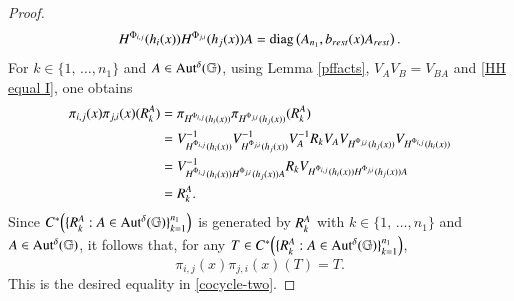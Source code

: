 \documentclass[leqno]{amsart}
\begin{document}
\begin{proof}
\begin{align}
			H^{\Phi_{i,j}}(h_{i}(x))H^{\Phi_{j,i}}(h_{j}(x))A
			={\rm diag}\left(A_{n_{1}},b_{rest}(x)A_{rest} \right).
		\end{align}
		For $k\in\{1,\,\dotsc,n_{1}\}$ and $A\in{\rm Aut^{\delta}}(\mathbb{G})$, using Lemma \ref{pffacts}, $V_{A}V_{B}=V_{BA}$ and \eqref{HH equal I}, one obtains
		\begin{align*}
			\pi_{i,j}(x)\pi_{j,i}(x)({ R}^{A}_{k})
			&=\pi_{H^{\Phi_{i,j}}(h_{i}(x))}\pi_{H^{\Phi_{j,i}}(h_{j}(x))}({ R}^{A}_{k})\\
			&=V_{H^{\Phi_{i,j}}(h_{i}(x))}^{-1} V_{H^{\Phi_{j,i}}(h_{j}(x))}^{-1} V_{A}^{-1} R_{k} V_{A} V_{H^{\Phi_{j,i}}(h_{j}(x))} V_{H^{\Phi_{i,j}}(h_{i}(x))}\\
			&=V_{H^{\Phi_{i,j}}(h_{i}(x))H^{\Phi_{j,i}}(h_{j}(x))A}^{-1} R_{k} V_{H^{\Phi_{i,j}}(h_{i}(x))H^{\Phi_{j,i}}(h_{j}(x))A}\\
			&={ R}^{A}_{k}.
		\end{align*}
		Since $C^{*}\Big(\{{ R}^{A}_{k}:A\in{\rm Aut^{\delta}}(\mathbb{G})\}_{k=1}^{n_{1}}\Big)$ is generated by ${ R}^{A}_{k}$ with $k\in\{1,\,\dotsc,n_{1}\}$ and $A\in{\rm Aut^{\delta}}(\mathbb{G})$, it follows that, for any $T\in C^{*}\Big(\{{ R}^{A}_{k}:A\in{\rm Aut^{\delta}}(\mathbb{G})\}_{k=1}^{n_{1}}\Big)$, $$\pi_{i,j}(x)\pi_{j,i}(x)(T)=T.$$ 
		This is the desired equality in \eqref{cocycle-two}.
		
		
		
		\bigskip
		

\end{proof}
\end{document}
